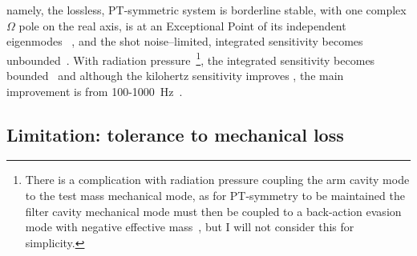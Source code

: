 namely, the lossless, PT-symmetric system is borderline stable, with one complex $\Omega$ pole on the real axis, is at an Exceptional Point of its independent eigenmodes~\cite{liBroadbandSensitivityImprovement2020} , and the shot noise--limited, integrated sensitivity becomes unbounded~\cite{}. With radiation pressure~\footnote{There is a complication with radiation pressure coupling the arm cavity mode to the test mass mechanical mode, as for PT-symmetry to be maintained the filter cavity mechanical mode must then be coupled to a back-action evasion mode with negative effective mass~\cite{}, but I will not consider this for simplicity.}, the integrated sensitivity becomes bounded~\cite{} and although the kilohertz sensitivity improves , the main improvement is from 100-1000~Hz~\cite{}. %



\subsection{Limitation: tolerance to mechanical loss}
\label{sec:sWLC_loss}

